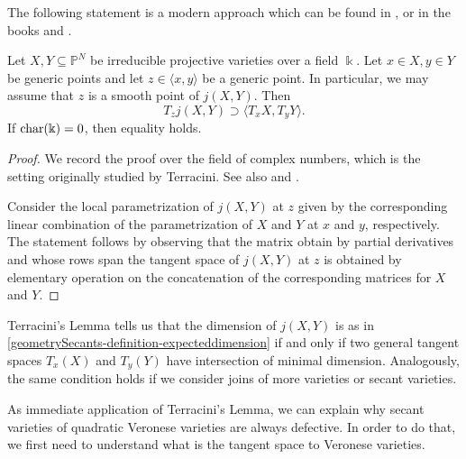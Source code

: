 The following statement is a modern approach which can be found in \cite{FR81}, \cite{Adl87} or in the books \cite[Theorem 1.10]{Zak93} and \cite[Theorem 1.4.1]{Rus16}.

\begin{lemma}
\label{geometrySecants-lemma-terracini}
    Let $X, Y \subseteq \mathbb{P}^N$ be irreducible projective varieties over a field $\Bbbk$. Let $x \in X, y \in Y$ be generic points and let $z \in \langle x,y \rangle$ be a generic point. In particular, we may assume that $z$ is a smooth point of $j(X,Y)$. Then
    \[
        T_{z} j(X,Y) \supset \langle T_x X , T_y Y\rangle.
    \]
    If ${\rm char}(\Bbbk) = 0$, then equality holds. 
\end{lemma}
\begin{proof}
We record the proof over the field of complex numbers, which is the setting originally studied by Terracini. See also \cite{BO08} and \cite{BCCGO18}. 

Consider the local parametrization of $j(X,Y)$ at $z$ given by the corresponding linear combination of the parametrization of $X$ and $Y$ at $x$ and $y$, respectively. The statement follows by observing that the matrix obtain by partial derivatives and whose rows span the tangent space of $j(X,Y)$ at $z$ is obtained by elementary operation on the concatenation of the corresponding matrices for $X$ and $Y$. 
\end{proof}

\begin{remark}
\label{geometrySecants-remark-terracini}
    Terracini's Lemma tells us that the dimension of $j(X,Y)$ is as in \ref{geometrySecants-definition-expecteddimension} if and only if two general tangent spaces $T_x(X)$ and $T_y(Y)$ have intersection of minimal dimension. Analogously, the same condition holds if we consider joins of more varieties or secant varieties. 
\end{remark}

As immediate application of Terracini's Lemma, we can explain why secant varieties of quadratic Veronese varieties are always defective. In order to do that, we first need to understand what is the tangent space to Veronese varieties. 

